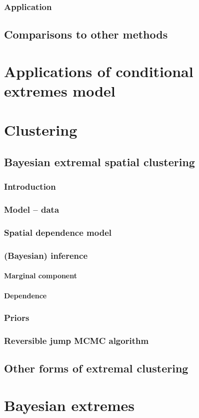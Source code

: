 \documentclass{article}
\begin{document}
\subsubsection{Application}

\subsection{Comparisons to other methods}

\section{Applications of conditional extremes model}

\section{Clustering}

\subsection{Bayesian extremal spatial clustering}
\subsubsection{Introduction}
\subsubsection{Model -- data}
\subsubsection{Spatial dependence model}
\subsubsection{(Bayesian) inference}
\paragraph{Marginal component}
\paragraph{Dependence}
\subsubsection{Priors}
\subsubsection{Reversible jump MCMC algorithm}

\subsection{Other forms of extremal clustering}

\section{Bayesian extremes}

\printbibliography
\end{document}
